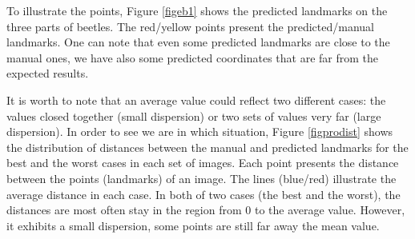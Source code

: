 \documentclass[review]{elsarticle}
\begin{document}
To illustrate the points, Figure \ref{figeb1} shows the predicted landmarks on the three parts of beetles. The red/yellow points present the predicted/manual landmarks. One can note that even some predicted landmarks are close to the manual ones, we have also some predicted coordinates that are far from the expected results.

It is worth to note that an average value could reflect two different cases: the values closed together (small dispersion) or two sets of values very far (large dispersion). In order to see we are in which situation, Figure \ref{figprodist} shows the distribution of distances between the manual and predicted landmarks for the best and the worst cases in each set of images. Each point presents the distance between the points (landmarks) of an image. The lines (blue/red) illustrate the average distance in each case. In both of two cases (the best and the worst), the distances are most often stay in the region from 0 to the average value. However, it exhibits a small dispersion, some points are still far away the mean value.
\end{document}
